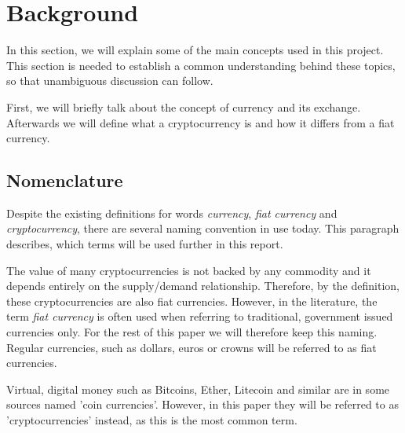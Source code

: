 \section{Background}\label{sec:background}
% 
In this section, we will explain some of the main concepts used in this project. This section is needed to establish a common understanding behind these topics, so that unambiguous discussion can follow.

First, we will briefly talk about the concept of currency and its exchange. Afterwards we will define what a cryptocurrency is and how it differs from a fiat currency. 
% 

% 

% 

% 

% 



\subsection{Nomenclature}
Despite the existing definitions for words \textit{currency}, \textit{fiat currency} and \textit{cryptocurrency}, there are several naming convention in use today. This paragraph describes, which terms will be used further in this report.

The value of many cryptocurrencies is not backed by any commodity and it depends entirely on the supply/demand relationship. Therefore, by the definition, these cryptocurrencies are also fiat currencies. However, in the literature, the term \emph{fiat currency} is often used when referring to traditional, government issued currencies only. For the rest of this paper we will therefore keep this naming. Regular currencies, such as dollars, euros or crowns will be referred to as fiat currencies.

Virtual, digital money such as Bitcoins, Ether, Litecoin and similar are in some sources named 'coin currencies'. However, in this paper they will be referred to as 'cryptocurrencies' instead, as this is the most common term.